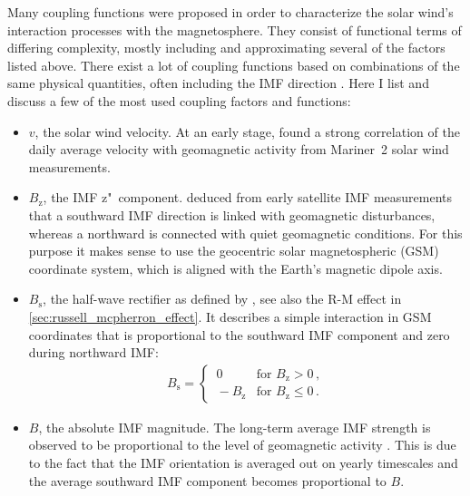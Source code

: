 Many coupling functions were proposed in order to characterize the solar wind's interaction processes with the magnetosphere. They consist of functional terms of differing complexity, mostly including and approximating several of the factors listed above. There exist a lot of coupling functions based on combinations of the same physical quantities, often including the IMF direction \citep{Newell2007,Lockwood2013}. Here I list and discuss a few of the most used coupling factors and functions:
\begin{itemize}
	\item $v$, the solar wind velocity. At an early stage, \citet{Snyder1963} found a strong correlation of the daily average velocity with geomagnetic activity from Mariner~2 solar wind measurements.
	
	\item $B_\text{z}$, the IMF z"~component. \citet{Fairfield1966} deduced from early satellite IMF measurements that a southward IMF direction is linked with geomagnetic disturbances, whereas a northward is connected with quiet geomagnetic conditions. For this purpose it makes sense to use the geocentric solar magnetospheric (GSM) coordinate system, which is aligned with the Earth's magnetic dipole axis.
	
	\item $B_\text{s}$, the half-wave rectifier as defined by \citet{Russell1973}, see also the R-M effect in \autoref{sec:russell_mcpherron_effect}. It describes a simple interaction in GSM coordinates that is proportional to the southward IMF component and zero during northward IMF:
	\begin{align}
		B_\text{s} =
		\begin{cases}
			\,0 &\text{for } B_\text{z} > 0	\,,\\
			\,-B_\text{z} &\text{for } B_\text{z} \le 0	\,.
		\end{cases}	\label{eq:half_wave_rectifier}
	\end{align}
	
	\item $B$, the absolute IMF magnitude. The long-term average IMF strength is observed to be proportional to the level of geomagnetic activity \citep{Stamper1999,Lockwood2013}. This is due to the fact that the IMF orientation is averaged out on yearly timescales and the average southward IMF component becomes proportional to $B$.
	

\end{itemize}
